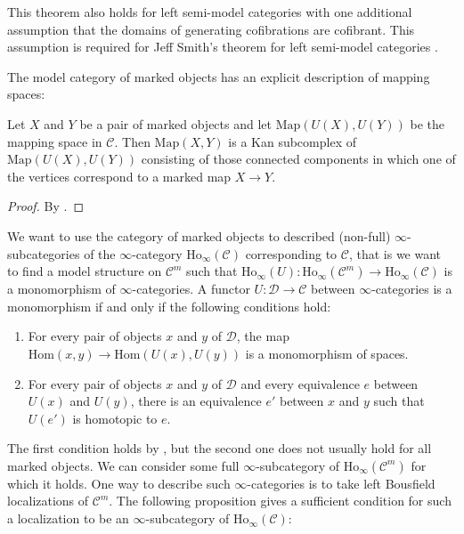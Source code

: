 \documentclass[reqno]{amsart}
\theoremstyle{definition}
\theoremstyle{remark}
\newcommand{\fs}[1]{\mathrm{#1}}
\newcommand{\Hom}{\fs{Hom}}
\newcommand{\Ho}{\fs{Ho}}
\newcommand{\cat}[1]{\mathcal{#1}}
\newcommand{\C}{\cat{C}}
\newcommand{\D}{\cat{D}}
\numberwithin{figure}{section}
\begin{document}
\begin{remark}
This theorem also holds for left semi-model categories with one additional assumption that the domains of generating cofibrations are cofibrant.
This assumption is required for Jeff Smith's theorem for left semi-model categories \cite[Theorem~3.1]{semi-smith}.
\end{remark}

The model category of marked objects has an explicit description of mapping spaces:

\begin{lem}
Let $X$ and $Y$ be a pair of marked objects and let $\mathrm{Map}(U(X),U(Y))$ be the mapping space in $\C$.
Then $\mathrm{Map}(X,Y)$ is a Kan subcomplex of $\mathrm{Map}(U(X),U(Y))$ consisting of those connected components in which one of the vertices correspond to a marked map $X \to Y$.
\end{lem}
\begin{proof}
By \cite[Lemma~3.4]{marked-obj}.
\end{proof}

We want to use the category of marked objects to described (non-full) $\infty$-subcategories of the $\infty$-category $\Ho_\infty(\C)$ corresponding to $\C$,
that is we want to find a model structure on $\C^m$ such that $\Ho_\infty(U) : \Ho_\infty(\C^m) \to \Ho_\infty(\C)$ is a monomorphism of $\infty$-categories.
A functor $U : \D \to \C$ between $\infty$-categories is a monomorphism if and only if the following conditions hold:
\begin{enumerate}
\item \label{it:mono-hom} For every pair of objects $x$ and $y$ of $\D$, the map $\Hom(x,y) \to \Hom(U(x),U(y))$ is a monomorphism of spaces.
\item \label{it:mono-eq} For every pair of objects $x$ and $y$ of $\D$ and every equivalence $e$ between $U(x)$ and $U(y)$, there is an equivalence $e'$ between $x$ and $y$ such that $U(e')$ is homotopic to $e$.
\end{enumerate}

The first condition holds by , but the second one does not usually hold for all marked objects.
We can consider some full $\infty$-subcategory of $\Ho_\infty(\C^m)$ for which it holds.
One way to describe such $\infty$-categories is to take left Bousfield localizations of $\C^m$.
The following proposition gives a sufficient condition for such a localization to be an $\infty$-subcategory of $\Ho_\infty(\C)$:
\end{document}
